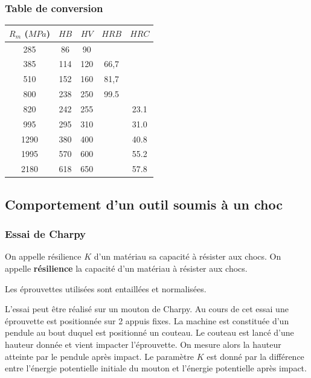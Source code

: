\documentclass[11pt,oneside]{article}
\begin{document}
\subsubsection*{Table de conversion}
\begin{center}
\begin{tabular}{|c|c|c|c|c|}
\hline 
$R_m$ ($MPa$) & $HB$ & $HV$ & $HRB$ & $HRC$\\
\hline \hline
285 & 86 & 90 & & \\
\hline
385 & 114 & 120 & 66,7 & \\ \hline
510 & 152 & 160 & 81,7 & \\ \hline
800 & 238 & 250 & 99.5 &\\ \hline
820 & 242 & 255 &  & 23.1 \\ \hline
995 & 295 & 310 &  & 31.0 \\ \hline
1290 & 380 & 400 &  & 40.8 \\ \hline
1995 & 570 & 600 &  & 55.2 \\ \hline
2180 & 618 & 650 &  & 57.8 \\ \hline
\end{tabular}
\end{center}

\subsection{Comportement d'un outil soumis à un choc}

\subsubsection{Essai de Charpy}

\begin{obj}
On appelle résilience $K$ d'un matériau sa capacité à résister aux chocs. On appelle \textbf{résilience} la capacité d'un matériau à résister aux chocs. 
\end{obj}

Les éprouvettes utilisées sont entaillées et normalisées. 

L'essai peut être réalisé sur un mouton de Charpy. Au cours de cet essai une éprouvette est positionnée sur 2 appuis fixes. La machine est constituée d'un pendule au bout duquel est positionné un couteau. Le couteau est lancé d'une hauteur donnée et vient impacter l'éprouvette. On mesure alors la hauteur atteinte par le pendule après impact. Le paramètre $K$ est donné par la différence entre l'énergie potentielle initiale du mouton et l'énergie potentielle après impact. 
\end{document}
